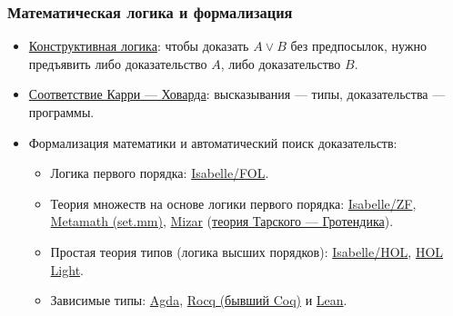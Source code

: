 \documentclass[11pt]{beamer}
\begin{document}
\begin{frame}[fragile]
  \frametitle{Математическая логика и формализация}
  \begin{itemize}
    \item \href{https://www.cs.cmu.edu/~fp/courses/15317-s23/lectures/02-natded.pdf}{Конструктивная логика}: чтобы доказать $A \lor B$ без предпосылок, нужно предъявить либо доказательство $A$, либо доказательство $B$.
    \item \href{https://homepages.inf.ed.ac.uk/wadler/papers/propositions-as-types/propositions-as-types.pdf}{Соответствие Карри — Ховарда}: высказывания — типы, доказательства — программы.

    \pause
    \item Формализация математики и автоматический поиск доказательств:
          \begin{itemize}
            \item Логика первого порядка: \href{https://isabelle.in.tum.de/dist/Isabelle2025-2/doc/logics-ZF.pdf}{Isabelle/FOL}.
            \item Теория множеств на основе логики первого порядка: \href{https://isabelle.in.tum.de/dist/Isabelle2025-2/doc/logics-ZF.pdf}{Isabelle/ZF}, \href{https://us.metamath.org/mpeuni/mmtheorems.html}{Metamath (set.mm)}, \href{https://wiki.mizar.org/library/}{Mizar} (\href{https://en.wikipedia.org/wiki/Tarski\%E2\%80\%93Grothendieck_set_theory}{теория Тарского — Гротендика}).
            \item Простая теория типов (логика высших порядков): \href{https://isabelle.in.tum.de/library/HOL/HOL/}{Isabelle/HOL}, \href{https://hol-light.github.io/}{HOL Light}.
            \item Зависимые типы: \href{https://agda.readthedocs.io/}{Agda}, \href{https://rocq-prover.org/}{Rocq (бывший Coq)} и \href{https://lean-lang.org/}{Lean}.
          \end{itemize}
  \end{itemize}
\end{frame}
\end{document}
